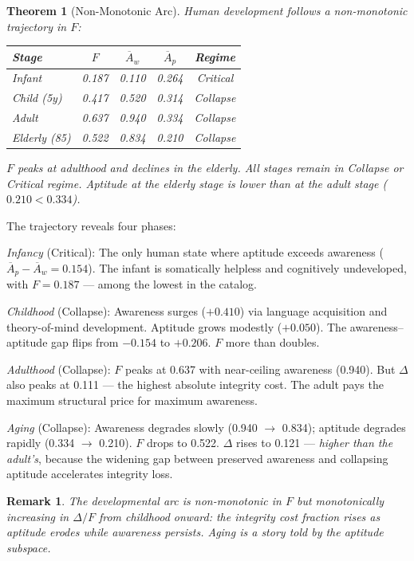 \documentclass[
  aps,
  prd,
  twocolumn,
  superscriptaddress,
  nofootinbib,
  floatfix
]{revtex4-2}
\newtheorem{theorem}{Theorem}
\newtheorem{remark}{Remark}
\newcommand{\Aw}{\overline{A}_{\!w}}
\newcommand{\Ap}{\overline{A}_{\!p}}
\newcommand{\DeltaF}{\Delta\!/\!F}
\begin{document}
\begin{theorem}[Non-Monotonic Arc]\label{thm:TAW7}
Human development follows a non-monotonic trajectory in $F$:
\begin{center}
\begin{tabular}{lcccc}
\toprule
Stage & $F$ & $\Aw$ & $\Ap$ & Regime \\
\midrule
Infant     & 0.187 & 0.110 & 0.264 & Critical \\
Child (5y) & 0.417 & 0.520 & 0.314 & Collapse \\
Adult      & 0.637 & 0.940 & 0.334 & Collapse \\
Elderly (85) & 0.522 & 0.834 & 0.210 & Collapse \\
\bottomrule
\end{tabular}
\end{center}
$F$ peaks at adulthood and declines in the elderly.
All stages remain in Collapse or Critical regime.
Aptitude at the elderly stage is lower than at
the adult stage ($0.210 < 0.334$).
\end{theorem}

The trajectory reveals four phases:

\emph{Infancy} (Critical): The only human state where aptitude
exceeds awareness ($\Ap - \Aw = 0.154$).  The infant is
somatically helpless and cognitively undeveloped, with
$F = 0.187$ --- among the lowest in the catalog.

\emph{Childhood} (Collapse): Awareness surges ($+0.410$) via
language acquisition and theory-of-mind development.  Aptitude
grows modestly ($+0.050$).  The awareness--aptitude gap flips
from $-0.154$ to $+0.206$.  $F$ more than doubles.

\emph{Adulthood} (Collapse): $F$ peaks at 0.637 with
near-ceiling awareness (0.940).  But $\Delta$ also peaks at
0.111 --- the highest absolute integrity cost.  The adult
pays the maximum structural price for maximum awareness.

\emph{Aging} (Collapse): Awareness degrades slowly (0.940 $\to$
0.834); aptitude degrades rapidly (0.334 $\to$ 0.210).  $F$
drops to 0.522.  $\Delta$ rises to 0.121 --- \emph{higher
than the adult's}, because the widening gap between preserved
awareness and collapsing aptitude accelerates integrity loss.

\begin{remark}
The developmental arc is non-monotonic in $F$ but
monotonically increasing in $\DeltaF$ from childhood onward:
the integrity cost fraction rises as aptitude erodes while
awareness persists.  Aging is a story told by the aptitude
subspace.
\end{remark}
\end{document}
